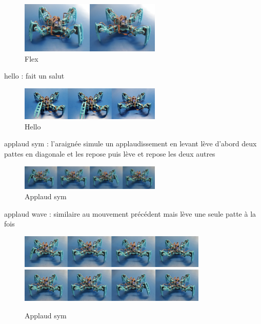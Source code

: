 \begin{figure}
	\begin{center}
		\includegraphics[width=0.6\textwidth]{./img/flex}
		\caption{Flex}
	\end{center}
\end{figure}

hello : fait un salut

\begin{figure}
	\begin{center}
		\includegraphics[width=0.6\textwidth]{./img/hello}
		\caption{Hello}
	\end{center}
\end{figure}

applaud sym : l'araignée simule un applaudissement en levant lève d'abord deux pattes en diagonale et les repose puis lève et repose les deux autres

\begin{figure}
	\begin{center}
		\includegraphics[width=0.6\textwidth]{./img/applaud_sym}
		\caption{Applaud sym}
	\end{center}
\end{figure}

applaud wave : similaire au mouvement précédent mais lève une seule patte à la fois

\begin{figure}
	\begin{center}
		\includegraphics[width=0.8\textwidth]{./img/applaud_wave_1}
		\includegraphics[width=0.8\textwidth]{./img/applaud_wave_2}
		\caption{Applaud sym}
	\end{center}
\end{figure}

